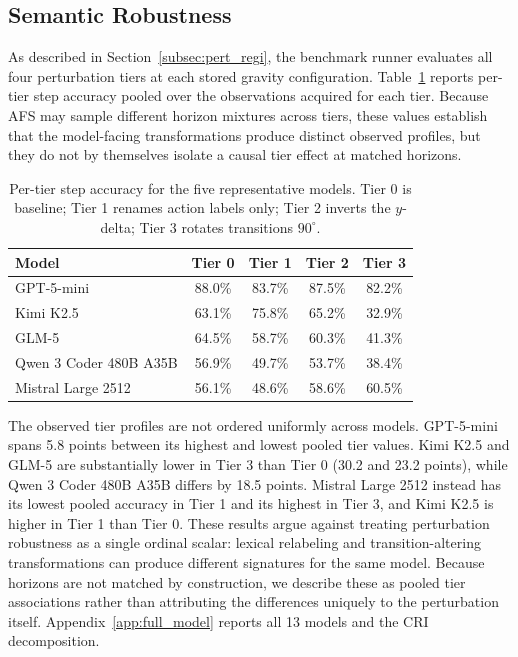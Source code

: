 \documentclass{article}
\begin{document}
\subsection{Semantic Robustness}
As described in Section~\ref{subsec:pert_regi}, the benchmark runner evaluates all four perturbation tiers at each stored gravity configuration. Table~\ref{tab:tier_selected} reports per-tier step accuracy pooled over the observations acquired for each tier. Because AFS may sample different horizon mixtures across tiers, these values establish that the model-facing transformations produce distinct observed profiles, but they do not by themselves isolate a causal tier effect at matched horizons.

\begin{table}[!ht]
\centering
\caption{Per-tier step accuracy for the five representative models. Tier 0 is baseline; Tier 1 renames action labels only; Tier 2 inverts the $y$-delta; Tier 3 rotates transitions $90^\circ$.}
\label{tab:tier_selected}
\scriptsize
\begin{tabular}{lcccc}
\toprule
\textbf{Model} & \textbf{Tier 0} & \textbf{Tier 1} & \textbf{Tier 2} & \textbf{Tier 3} \\
\midrule
GPT-5-mini & 88.0\% & 83.7\% & 87.5\% & 82.2\% \\
Kimi K2.5 & 63.1\% & 75.8\% & 65.2\% & 32.9\% \\
GLM-5 & 64.5\% & 58.7\% & 60.3\% & 41.3\% \\
Qwen 3 Coder 480B A35B & 56.9\% & 49.7\% & 53.7\% & 38.4\% \\
Mistral Large 2512 & 56.1\% & 48.6\% & 58.6\% & 60.5\% \\
\bottomrule
\end{tabular}
\end{table}

The observed tier profiles are not ordered uniformly across models. GPT-5-mini spans 5.8 points between its highest and lowest pooled tier values. Kimi K2.5 and GLM-5 are substantially lower in Tier 3 than Tier 0 (30.2 and 23.2 points), while Qwen 3 Coder 480B A35B differs by 18.5 points. Mistral Large 2512 instead has its lowest pooled accuracy in Tier 1 and its highest in Tier 3, and Kimi K2.5 is higher in Tier 1 than Tier 0. These results argue against treating perturbation robustness as a single ordinal scalar: lexical relabeling and transition-altering transformations can produce different signatures for the same model. Because horizons are not matched by construction, we describe these as pooled tier associations rather than attributing the differences uniquely to the perturbation itself. Appendix~\ref{app:full_model} reports all 13 models and the CRI decomposition.
\end{document}
